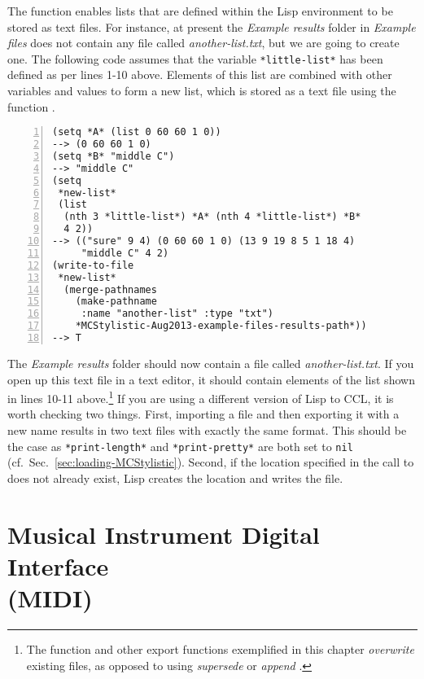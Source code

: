 The function  enables lists that are defined within the Lisp environment to be stored as text files. For instance, at present the \emph{Example results} folder in \emph{Example files} does not contain any file called \emph{another-list.txt}, but we are going to create one. The following code assumes that the variable \texttt{*little-list*} has been defined as per lines 1-10 above. Elements of this list are combined with other variables and values to form a new list, which is stored as a text file using the function .
\begin{Verbatim}[frame=single,numbers=left]
(setq *A* (list 0 60 60 1 0))
--> (0 60 60 1 0)
(setq *B* "middle C")
--> "middle C"
(setq
 *new-list*
 (list
  (nth 3 *little-list*) *A* (nth 4 *little-list*) *B*
  4 2))
--> (("sure" 9 4) (0 60 60 1 0) (13 9 19 8 5 1 18 4)
     "middle C" 4 2)
(write-to-file
 *new-list*
  (merge-pathnames
    (make-pathname
     :name "another-list" :type "txt")
    *MCStylistic-Aug2013-example-files-results-path*))
--> T
\end{Verbatim}
The \emph{Example results} folder should now contain a file called \emph{another-list.txt}. If you open up this text file in a text editor, it should contain elements of the list shown in lines 10-11 above.\footnote{The function  and other export functions exemplified in this chapter \emph{overwrite} existing files, as opposed to using \emph{supersede} or \emph{append} \citep*[for details, see][]{seibel2005}.} If you are using a different version of Lisp to CCL, it is worth checking two things. First, importing a file and then exporting it with a new name results in two text files with exactly the same format. This should be the case as \texttt{*print-length*} and \texttt{*print-pretty*} are both set to \texttt{nil} (cf.~Sec.~\ref{sec:loading-MCStylistic}). Second, if the location specified in the call to  does not already exist, Lisp creates the location and writes the file.

\section[Musical Instrument Digital Interface (MIDI)]{Musical Instrument Digital Interface\\ (MIDI)}\label{sec:MIDI}

